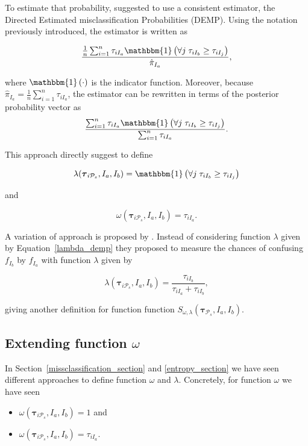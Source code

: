 \documentclass[10pt, a4paper]{article}
\newcommand{\m}[1]{\boldsymbol{#1}}
\begin{document}
\begin{spacing}{1.9}
To estimate that probability,  \cite{hennig2010methods} suggested to use a consistent estimator, the Directed Estimated misclassification Probabilities (DEMP). Using the notation previously introduced, the estimator is written as

\[
\frac{ \frac{1}{n} \sum_{i=1}^n {\tau_{iI_a} \mathbbm{1}\left( \forall j\; \tau_{i I_{b}} \geq \tau_{iI_j} \right)}}{ \hat{\pi}_{I_a}},
\]

where $\mathbbm{1}\left( \cdot \right)$ is the indicator function. Moreover, because $ \hat{\pi}_{I_a} = \frac{1}{n} \sum_{i=1}^n \tau_{iI_a}$, the estimator can be rewritten in terms of the posterior probability vector as
\begin{equation}\label{demp_criteria}
\frac{ \sum_{i=1}^n {\tau_{iI_a} \mathbbm{1}\left( \forall j\; \tau_{i I_{b}} \geq \tau_{iI_j} \right)}}{\sum_{i=1}^n \tau_{iI_a} }.
\end{equation}

This approach directly suggest to define

\begin{equation}\label{lambda_demp}
\lambda(\m\tau_{i \mathcal{P}_s},  I_a,  I_b) = \mathbbm{1}\left( \forall j\; \tau_{i I_{b}} \geq \tau_{iI_j} \right)
\end{equation}

and

\[
\omega(\m\tau_{i \mathcal{P}_s},  I_a,  I_b) =  \tau_{iI_a}.
\]

A variation of \cite{hennig2010methods} approach is proposed by \cite{longford2014}. Instead of considering function $\lambda$ given by Equation~\ref{lambda_demp} they proposed to measure the chances of confusing $f_{I_b}$ by $f_{I_a}$ with function $\lambda$ given by

\[
\lambda(\m\tau_{i \mathcal{P}_s},  I_a,  I_b) = \frac{\tau_{iI_b}}{\tau_{iI_a} + \tau_{iI_b}},
\]

giving another definition for function function $S_{\omega, \lambda}( \m\tau_{\mathcal{P}_s},  I_a,  I_b)$.


\subsection{Extending function $\omega$}

In Section~\ref{missclassification_section} and \ref{entropy_section} we have seen different approaches to define function $\omega$ and $\lambda$. Concretely, for function $\omega$ we have seen

\begin{itemize}
\item $\omega(\m\tau_{i \mathcal{P}_s},  I_a,  I_b) = 1$ and
\item $\omega(\m\tau_{i \mathcal{P}_s},  I_a,  I_b) = \tau_{iI_a}$.
\end{itemize}


\end{spacing}
\end{document}
